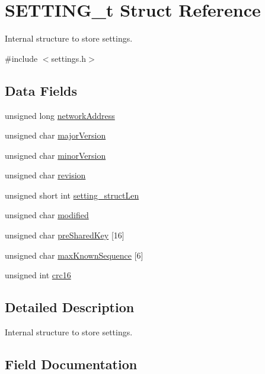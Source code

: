 \hypertarget{struct_s_e_t_t_i_n_g__t}{}\section{S\+E\+T\+T\+I\+N\+G\+\_\+t Struct Reference}
\label{struct_s_e_t_t_i_n_g__t}


Internal structure to store settings.  




{\ttfamily \#include $<$settings.\+h$>$}

\subsection*{Data Fields}
\begin{DoxyCompactItemize}
\item 
unsigned long \hyperlink{struct_s_e_t_t_i_n_g__t_aff8093810fd27a53fc13f58c12d5822e}{network\+Address}
\item 
unsigned char \hyperlink{struct_s_e_t_t_i_n_g__t_ab4d6d53b3f3d6e15cbc895048c8a0be8}{major\+Version}
\item 
unsigned char \hyperlink{struct_s_e_t_t_i_n_g__t_a1a92b6a7e593b2cc33170738ce922bb4}{minor\+Version}
\item 
unsigned char \hyperlink{struct_s_e_t_t_i_n_g__t_af3d9265da105cdb5ac5f2544580aee19}{revision}
\item 
unsigned short int \hyperlink{struct_s_e_t_t_i_n_g__t_a41c4ce6120b5d5cad4345ea11c7fb9f8}{setting\+\_\+struct\+Len}
\item 
unsigned char \hyperlink{struct_s_e_t_t_i_n_g__t_ac1df118970505d5f9f159dcc16ed40c6}{modified}
\item 
unsigned char \hyperlink{struct_s_e_t_t_i_n_g__t_a16c8844dfc94f0dd9c95bf20a2478cc2}{pre\+Shared\+Key} \mbox{[}16\mbox{]}
\item 
unsigned char \hyperlink{struct_s_e_t_t_i_n_g__t_a98f0d57250f6021260d0bb5fe0e07251}{max\+Known\+Sequence} \mbox{[}6\mbox{]}
\item 
unsigned int \hyperlink{struct_s_e_t_t_i_n_g__t_aa208bfad15c69125ef6c22648bd90172}{crc16}
\end{DoxyCompactItemize}


\subsection{Detailed Description}
Internal structure to store settings. 

\subsection{Field Documentation}
\mbox{\label{struct_s_e_t_t_i_n_g__t_aa208bfad15c69125ef6c22648bd90172}} 
